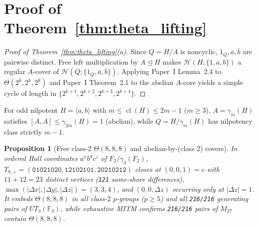 \documentclass[11pt]{amsart}
\newtheorem{proposition}[theorem]{Proposition}
\theoremstyle{remark}
\newcommand{\F}{\mathbb{F}}
\newcommand{\Haar}{\mathcal{H}}
\newcommand{\cl}{\operatorname{cl}}
\begin{document}
\section{Proof of Theorem~\ref{thm:theta_lifting}}

\begin{proof}[Proof of Theorem~\ref{thm:theta_lifting}(a)]
Since $Q = H/A$ is noncyclic, $1_Q, \overline{a}, \overline{b}$ are pairwise distinct. Free left multiplication by $A \trianglelefteq H$ makes $\Haar(H; \{1, a, b\})$ a regular $A$-cover of $\Haar(Q; \{1_Q, \overline{a}, \overline{b}\})$. Applying Paper~I Lemma~2.4 to $\Theta(2^k, 2^k, 2^k)$ and Paper~I Theorem~2.1 to the abelian $A$-core yields a simple cycle of length in $\{2^{k+1}, 2^{k+2}, 2^{k+3}, 2^{k+4}\}$.
\end{proof}

For odd nilpotent $H = \langle a, b \rangle$ with $m \le \cl(H) \le 2m - 1$ ($m \ge 3$), $A = \gamma_m(H)$ satisfies $[A, A] \le \gamma_{2m}(H) = 1$ (abelian), while $Q = H/\gamma_m(H)$ has nilpotency class strictly $m - 1$.

\begin{proposition}[Free class-2 $\Theta(8,8,8)$ and abelian-by-(class 2) covers]\label{prop:class2_theta8}
In ordered Hall coordinates $a^x b^y c^z$ of $F_2 / \gamma_3(F_2)$, $T_{8,+} = (\mathtt{01021020}, \mathtt{12102101}, \mathtt{20210212})$ closes at $(0, 0, 1) = c$ with $11 + 12 = 23$ distinct vertices (\texttt{121} same-shore differences), $\max(|\Delta x|, |\Delta y|, |\Delta z|) = (3, 3, 4)$, and $(0, 0, \Delta z)$ occurring only at $|\Delta z| = 1$. It embeds $\Theta(8,8,8)$ in all class-$2$ $p$-groups ($p \ge 5$) and all \texttt{216/216} generating pairs of $UT_3(\F_3)$, while exhaustive MITM confirms \texttt{216/216} pairs of $M_{27}$ contain $\Theta(8, 8, 8)$.
\end{proposition}
\end{document}
